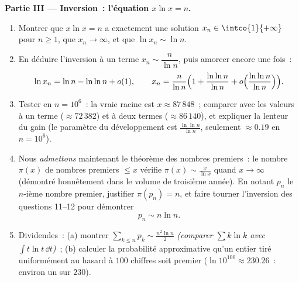 \begin{problem}
\medskip
\noindent\textbf{Partie III --- Inversion~: l'équation $x\ln x =
n$.}
\begin{enumerate}[resume]
  \item Montrer que $x\ln x = n$ a exactement une solution $x_n \in
        \intco{1}{+\infty}$ pour $n \geq 1$, que $x_n \to
        \infty$, et que $\ln x_n \sim \ln n$.
  \item En déduire l'inversion à un terme $x_n \sim
        \dfrac{n}{\ln n}$, puis amorcer encore une fois~:
        \[
        \ln x_n = \ln n - \ln\ln n + o(1),
        \qquad
        x_n = \frac{n}{\ln n}\Bigl(1 + \frac{\ln\ln n}{\ln n}
        + o\Bigl(\frac{\ln\ln n}{\ln n}\Bigr)\Bigr).
        \]
  \item Tester en $n = 10^6$~: la vraie racine est $x \approx
        87\,848$~; comparer avec les valeurs à un terme ($\approx
        72\,382$) et à deux termes ($\approx 86\,140$), et expliquer
        la lenteur du gain (le paramètre du développement est
        $\frac{\ln\ln n}{\ln n}$, seulement $\approx 0.19$ en $n =
        10^6$).
  \item Nous \emph{admettons} maintenant le théorème des nombres
        premiers~: le nombre $\pi(x)$ de nombres premiers $\leq x$
        vérifie $\pi(x) \sim \frac{x}{\ln x}$ quand $x \to \infty$
        (démontré honnêtement dans le volume de troisième année). En
        notant $p_n$ le $n$-ième nombre premier, justifier $\pi(p_n) =
        n$, et faire tourner l'inversion des questions 11--12 pour
        démontrer
        \[
        p_n \sim n \ln n .
        \]
  \item Dividendes~: (a) montrer $\sum_{k \leq n} p_k \sim
        \frac{n^2\ln n}{2}$ \emph{(comparer $\sum k\ln k$ avec
        $\int t\ln t\,\dd t$)}~; (b) calculer la probabilité
        approximative qu'un entier tiré uniformément au hasard à $100$
        chiffres soit premier ($\ln 10^{100} \approx 230.26$~: environ
        un sur $230$).
\end{enumerate}


\end{problem}
